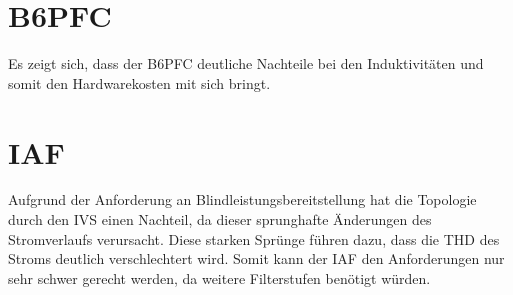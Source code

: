 \section{\gls{B6PFC}}
Es zeigt sich, dass der \gls{B6PFC} deutliche Nachteile bei den Induktivitäten und somit den Hardwarekosten mit sich bringt.

\section{\gls{IAF}}
Aufgrund der Anforderung an Blindleistungsbereitstellung hat die Topologie durch den \gls{IVS} einen Nachteil, da dieser sprunghafte Änderungen des Stromverlaufs verursacht. Diese starken Sprünge führen dazu, dass die \gls{THD} des Stroms deutlich verschlechtert wird. Somit kann der \gls{IAF} den Anforderungen nur sehr schwer gerecht werden, da weitere Filterstufen benötigt würden.